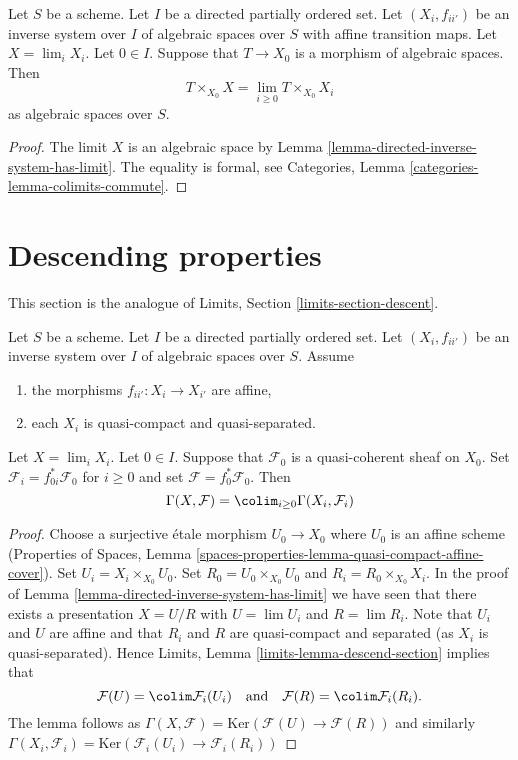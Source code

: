 \begin{lemma}
\label{lemma-space-over-limit}
Let $S$ be a scheme. Let $I$ be a directed partially ordered set.
Let $(X_i, f_{ii'})$ be an inverse system over $I$ of algebraic spaces
over $S$ with affine transition maps.
Let $X = \lim_i X_i$. Let $0 \in I$. Suppose that $T \to X_0$ is a
morphism of algebraic spaces. Then
$$
T \times_{X_0} X = \lim_{i \geq 0} T \times_{X_0} X_i
$$
as algebraic spaces over $S$.
\end{lemma}

\begin{proof}
The limit $X$ is an algebraic space by
Lemma \ref{lemma-directed-inverse-system-has-limit}.
The equality is formal, see
Categories, Lemma \ref{categories-lemma-colimits-commute}.
\end{proof}





\section{Descending properties}
\label{section-descent}

\noindent
This section is the analogue of Limits, Section \ref{limits-section-descent}.

\begin{lemma}
\label{lemma-descend-section}
Let $S$ be a scheme. Let $I$ be a directed partially ordered set.
Let $(X_i, f_{ii'})$ be an inverse system over $I$ of algebraic spaces
over $S$. Assume
\begin{enumerate}
\item the morphisms $f_{ii'} : X_i \to X_{i'}$ are affine,
\item each $X_i$ is quasi-compact and quasi-separated.
\end{enumerate}
Let $X = \lim_i X_i$. Let $0 \in I$. Suppose that $\mathcal{F}_0$ is a
quasi-coherent sheaf on $X_0$. Set $\mathcal{F}_i = f_{0i}^*\mathcal{F}_0$
for $i \geq 0$ and set $\mathcal{F} = f_0^*\mathcal{F}_0$. Then
$$
\Gamma(X, \mathcal{F}) = \colim_{i \geq 0} \Gamma(X_i, \mathcal{F}_i)
$$
\end{lemma}

\begin{proof}
Choose a surjective \'etale morphism $U_0 \to X_0$ where $U_0$ is an affine
scheme (Properties of Spaces, Lemma
\ref{spaces-properties-lemma-quasi-compact-affine-cover}).
Set $U_i = X_i \times_{X_0} U_0$.
Set $R_0 = U_0 \times_{X_0} U_0$ and $R_i = R_0 \times_{X_0} X_i$.
In the proof of Lemma \ref{lemma-directed-inverse-system-has-limit} we have
seen that there exists a presentation $X = U/R$ with
$U = \lim U_i$ and $R = \lim R_i$.
Note that $U_i$ and $U$ are affine and that $R_i$ and $R$ are
quasi-compact and separated (as $X_i$ is quasi-separated). Hence
Limits, Lemma \ref{limits-lemma-descend-section}
implies that
$$
\mathcal{F}(U) = \colim \mathcal{F}_i(U_i)
\quad\text{and}\quad
\mathcal{F}(R) = \colim \mathcal{F}_i(R_i).
$$
The lemma follows as
$\Gamma(X, \mathcal{F}) = \text{Ker}(\mathcal{F}(U) \to \mathcal{F}(R))$
and similarly
$\Gamma(X_i, \mathcal{F}_i) =
\text{Ker}(\mathcal{F}_i(U_i) \to \mathcal{F}_i(R_i))$
\end{proof}

